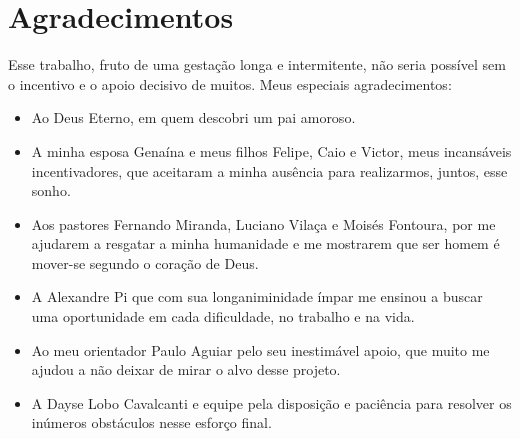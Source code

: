 
\chapter*{Agradecimentos}


Esse trabalho, fruto de uma gestação longa e intermitente, não seria possível
sem o incentivo e o apoio decisivo de muitos. Meus especiais agradecimentos:

\begin{itemize}

\item[\davidsstar] Ao Deus Eterno, em quem descobri um pai amoroso.

\item[\davidsstar] A minha esposa Genaína e meus filhos Felipe, Caio e Victor, meus incansáveis incentivadores,
que aceitaram a minha ausência para realizarmos, juntos, esse sonho.

\item[\davidsstar] Aos pastores Fernando Miranda, Luciano Vilaça e Moisés Fontoura, por me ajudarem a resgatar
a minha humanidade e me mostrarem que ser homem é mover-se segundo o coração de Deus.

\item[\davidsstar] A Alexandre Pi que com sua longaniminidade ímpar me ensinou a buscar uma oportunidade em cada dificuldade,
no trabalho e na vida.

\item[\davidsstar] Ao meu orientador Paulo Aguiar pelo seu inestimável apoio, que muito me ajudou a não deixar de
mirar o alvo desse projeto.

\item[\davidsstar] A Dayse Lobo Cavalcanti e equipe pela disposição e paciência para resolver
os inúmeros obstáculos nesse esforço final.

\end{itemize}
